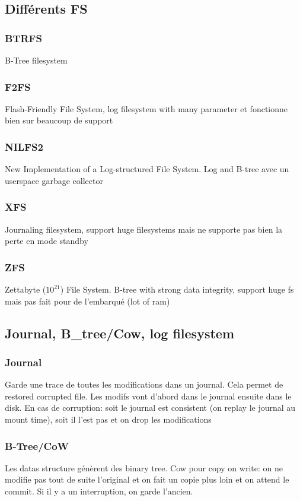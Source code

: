 \subsection{Différents FS}
\subsubsection{BTRFS}
B-Tree filesystem
\subsubsection{F2FS}
Flash-Friendly File System, log filesystem with many parameter et fonctionne bien sur beaucoup de support
\subsubsection{NILFS2}
New Implementation of a Log-structured File System. Log and B-tree avec un userspace garbage collector
\subsubsection{XFS}
Journaling filesystem, support huge filesystems mais ne supporte pas bien la perte en mode standby
\subsubsection{ZFS}
Zettabyte ($10^21$) File System. B-tree with strong data integrity, support huge fs mais pas fait pour de l'embarqué (lot of ram)
\subsection{Journal, B\_tree/Cow, log filesystem}
\subsubsection{Journal}
Garde une trace de toutes les modifications dans un journal. Cela permet de restored corrupted file. Les modifs vont d'abord dans le journal ensuite dans le disk. En cas de corruption: soit le journal est consistent (on replay le journal au mount time), soit il l'est pas et on drop les modifications
\subsubsection{B-Tree/CoW}
Les datas structure génèrent des binary tree. Cow pour copy on write: on ne modifie pas tout de suite l'original et on fait un copie plus loin et on attend le commit. Si il y a un interruption, on garde l'ancien.
